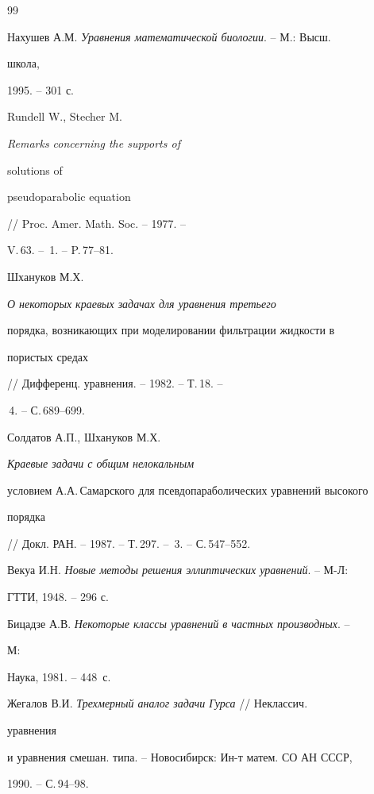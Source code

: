 \begin{thebibliography}{99} 


 




Нахушев А.М. {\em Уравнения математической биологии}. -- М.: Высш. 


школа, 


1995. -- 301 с. 




Rundell W., Stecher M. {\em Remarks concerning the supports of 


solutions of 


pseudoparabolic equation} // Proc. Amer. Math. Soc. -- 1977. -- 


V.\,63. -- \No\,1. -- P.\,77--81. 




Шхануков М.Х. {\em О некоторых краевых задачах для уравнения третьего  


порядка, возникающих при моделировании фильтрации жидкости в  


пористых средах} // Дифференц. уравнения. -- 1982. -- Т.\,18. -- 


\No\,4. -- С.\,689--699. 




Солдатов А.П., Шхануков М.Х. {\em Краевые задачи с общим нелокальным  


условием А.А.\,Самарского для псевдопараболических уравнений высокого  


порядка} // Докл. РАН. -- 1987. -- Т.\,297. -- \No\,3. -- С.\,547--552. 




Векуа И.Н. {\em Новые методы решения эллиптических уравнений}. -- М-Л: 


ГТТИ, 1948. -- 296 с. 




Бицадзе А.В. {\em Некоторые классы уравнений в частных производных}. -- 


М: 


Наука, 1981. -- 448~с. 




Жегалов В.И. {\em Трехмерный аналог задачи Гурса} // Неклассич. 


уравнения  


и уравнения смешан. типа. -- Новосибирск: Ин-т матем. СО АН СССР, 


1990. -- С.\,94--98. 



\end{thebibliography}

